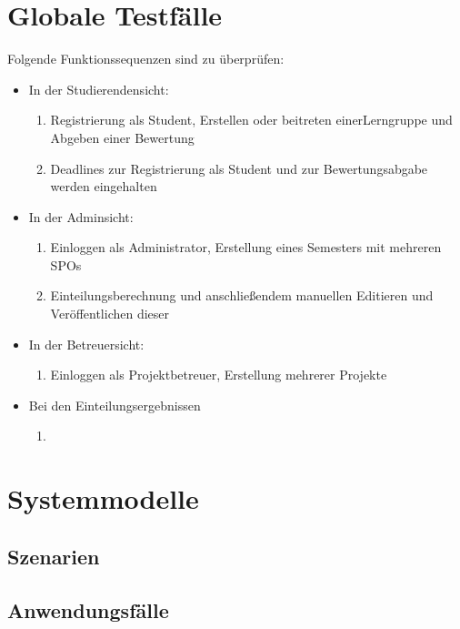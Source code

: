 \documentclass[parskip=full]{scrartcl}
\newcommand{\swtLabel}[1]{\textbf{/#1\arabic*0/}}
\begin{document}
\section{Globale Testfälle}
Folgende Funktionssequenzen sind zu überprüfen:

\begin{itemize}
  \item In der Studierendensicht:


\begin{enumerate} [label=\swtLabel{T}]
  
  
  \item Registrierung als Student, Erstellen oder beitreten einer\gls{Lerngruppe} und Abgeben einer Bewertung
  \item Deadlines zur Registrierung als Student und zur Bewertungsabgabe werden eingehalten
  

\end{enumerate}
  \item In der Adminsicht:
   \begin{enumerate} [label=\swtLabel{T}, resume]
  \item Einloggen als Administrator, Erstellung eines Semesters mit mehreren SPOs
  \item Einteilungsberechnung und anschließendem manuellen Editieren und
  Veröffentlichen dieser
\end{enumerate}
  \item In der Betreuersicht:
   \begin{enumerate} [label=\swtLabel{T}, resume]
  \item Einloggen als Projektbetreuer, Erstellung mehrerer Projekte
\end{enumerate}
  \item Bei den Einteilungsergebnissen
   \begin{enumerate} [label=\swtLabel{T}, resume]
  \item 
\end{enumerate}
\end{itemize}

\section{Systemmodelle}

\subsection{Szenarien}

\subsection{Anwendungsfälle}
\end{document}
